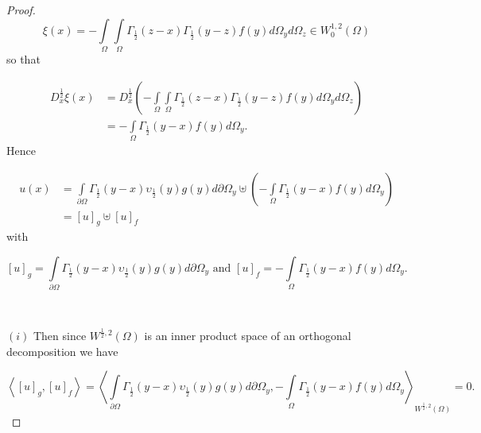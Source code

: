 \documentclass[10pt,a4paper]{amsart}
\numberwithin{equation}{section}
\begin{document}
\begin{proof}
\[
\xi\left(  x\right)  =-%
{\displaystyle\int\limits_{\Omega}}
{\displaystyle\int\limits_{\Omega}}
\Gamma_{\frac{1}{2}}\left(  z-x\right)  \Gamma_{\frac{1}{2}}\left(
y-z\right)  f(y)d\Omega_{y}d\Omega_{z}\in W_{0}^{1,2}\left(  \Omega\right)
\]
so that \ \ \ %

\begin{align*}
D_{x}^{\frac{1}{2}}\xi\left(  x\right)   & =D_{x}^{\frac{1}{2}}\left(  -%
{\displaystyle\int\limits_{\Omega}}
{\displaystyle\int\limits_{\Omega}}
\Gamma_{\frac{1}{2}}\left(  z-x\right)  \Gamma_{\frac{1}{2}}\left(
y-z\right)  f(y)d\Omega_{y}d\Omega_{z}\right) \\
& =-%
{\displaystyle\int\limits_{\Omega}}
\Gamma_{\frac{1}{2}}\left(  y-x\right)  f(y)d\Omega_{y}\text{.}%
\end{align*}
Hence \ %

\begin{align*}
u(x)  & =%
{\displaystyle\int\limits_{\partial\Omega}}
\Gamma_{\frac{1}{2}}\left(  y-x\right)  \upsilon_{\frac{1}{2}}\left(
y\right)  g(y)d\partial\Omega_{y}\uplus\left(  -%
{\displaystyle\int\limits_{\Omega}}
\Gamma_{\frac{1}{2}}\left(  y-x\right)  f(y)d\Omega_{y}\right) \\
& =\left[  u\right]  _{g}\uplus\left[  u\right]  _{f}%
\end{align*}
with%

\[
\left[  u\right]  _{g}=%
{\displaystyle\int\limits_{\partial\Omega}}
\Gamma_{\frac{1}{2}}\left(  y-x\right)  \upsilon_{\frac{1}{2}}\left(
y\right)  g(y)d\partial\Omega_{y}\text{ \ \ and \ \ }\left[  u\right]  _{f}=-%
{\displaystyle\int\limits_{\Omega}}
\Gamma_{\frac{1}{2}}\left(  y-x\right)  f(y)d\Omega_{y}\text{.}%
\]


\ 

$\left(  i\right)  $ Then since $W^{\frac{1}{2},2}\left(  \Omega\right)  $ is
an inner product space of an orthogonal decomposition we have%

\[
\left\langle \left[  u\right]  _{g},\left[  u\right]  _{f}\right\rangle
=\left\langle
{\displaystyle\int\limits_{\partial\Omega}}
\Gamma_{\frac{1}{2}}\left(  y-x\right)  \upsilon_{\frac{1}{2}}\left(
y\right)  g(y)d\partial\Omega_{y},-%
{\displaystyle\int\limits_{\Omega}}
\Gamma_{\frac{1}{2}}\left(  y-x\right)  f(y)d\Omega_{y}\right\rangle
_{W^{\frac{1}{2},2}\left(  \Omega\right)  }=0\text{.}%
\]



\end{proof}
\end{document}
